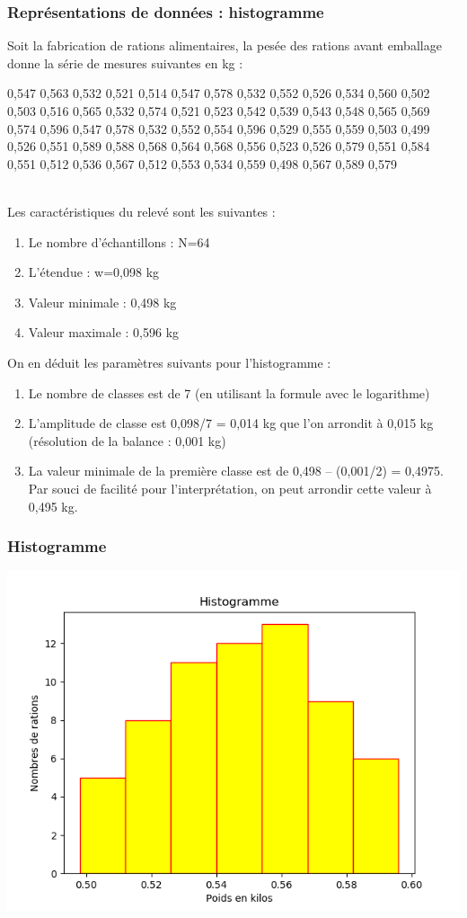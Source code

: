 \documentclass[10pt, french]{beamer}
\begin{document}
\begin{frame}\frametitle{Représentations de données : histogramme}Soit la fabrication de rations alimentaires, la pesée des rations avant emballage donne la série de mesures suivantes en kg :\\
\begin{tiny}
0,547	0,563	0,532	0,521	0,514	0,547	0,578	0,532	0,552	0,526	0,534	0,560	0,502	0,503	0,516	0,565
0,532	0,574	0,521	0,523	0,542	0,539	0,543	0,548	0,565	0,569	0,574	0,596	0,547	0,578	0,532	0,552
0,554	0,596	0,529	0,555	0,559	0,503	0,499	0,526	0,551	0,589	0,588	0,568	0,564	0,568	0,556	0,523
0,526	0,579	0,551	0,584	0,551	0,512	0,536	0,567	0,512	0,553	0,534	0,559	0,498	0,567	0,589	0,579
\end{tiny}\\
Les caractéristiques du relevé sont les suivantes :
\begin{enumerate}
\item Le nombre d'échantillons : N=64
\item L'étendue : w=0,098 kg
\item Valeur minimale : 0,498 kg
\item Valeur maximale : 0,596 kg
\end{enumerate}
On en déduit les paramètres suivants pour l'histogramme :
\begin{enumerate}
\item  Le nombre de classes est de 7 (en utilisant la formule avec le logarithme)
\item L'amplitude de classe est 0,098/7 = 0,014 kg que l'on arrondit à 0,015 kg (résolution de la balance : 0,001 kg)
\item La valeur minimale de la première classe est de 0,498 – (0,001/2) = 0,4975. Par souci de facilité pour l'interprétation, on peut arrondir cette valeur à 0,495 kg.
\end{enumerate}
\end{frame}
\begin{frame}\frametitle{Histogramme}
\includegraphics[width=3.in]{Images/histogramme_exo2_cor.png}
\end{frame}
\end{document}
